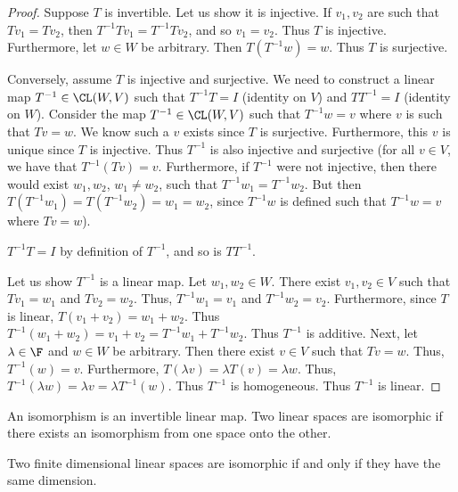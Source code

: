 \documentclass{article}
\begin{document}
  \begin{proof}
    Suppose $T$ is invertible. Let us show it is injective. If $v_1, v_2$ are such that $Tv_1 = Tv_2$, then $T^{-1}Tv_1 = T^{-1}Tv_2$, and so $v_1 = v_2$. Thus $T$ is injective. Furthermore,
    let $w \in W$ be arbitrary. Then $T(T^{-1}w) = w$. Thus $T$ is surjective. 

    Conversely, assume $T$ is injective and surjective. We need to construct a linear map $T^{-1} \in \CL(W, V)$ such that $T^{-1}T = I$ (identity on $V$) and $TT^{-1} = I$ (identity on
    $W$). Consider the map $T^{-1} \in \CL(W, V)$ such that $T^{-1}w = v$ where $v$ is such that $Tv = w$. We know such a $v$ exists since $T$ is surjective. Furthermore, this $v$ is unique
    since $T$ is injective. Thus $T^{-1}$ is also injective and surjective (for all $v \in V$, we have that $T^{-1}(Tv) = v$. Furthermore, if $T^{-1}$ were not injective, then there would
    exist $w_1, w_2$, $w_1 \neq w_2$, such that $T^{-1}w_1 = T^{-1}w_2$. But then $T(T^{-1}w_1) = T(T^{-1}w_2) = w_1 = w_2$, since $T^{-1}w$ is defined such that $T^{-1}w = v$ where $Tv =
    w$). 

    $T^{-1}T = I$ by definition of $T^{-1}$, and so is $TT^{-1}$.

    Let us show $T^{-1}$ is a linear map. Let $w_1, w_2 \in W$. There exist $v_1, v_2 \in V$ such that $Tv_1 = w_1$ and $Tv_2 = w_2$. Thus, $T^{-1}w_1 = v_1$ and $T^{-1}w_2 = v_2$.
    Furthermore, since $T$ is linear, $T(v_1 + v_2) = w_1 + w_2$. Thus $T^{-1}(w_1 + w_2) = v_1 + v_2 = T^{-1}w_1 + T^{-1}w_2$. Thus $T^{-1}$ is additive. Next, let $\lambda \in \F$ and $w
    \in W$ be arbitrary. Then there exist $v \in V$ such that $Tv = w$.  Thus, $T^{-1}(w) = v$. Furthermore, $T(\lambda v) = \lambda T(v) = \lambda w$. Thus, $T^{-1}(\lambda w) = \lambda v =
    \lambda T^{-1}(w)$. Thus $T^{-1}$ is homogeneous. Thus $T^{-1}$ is linear.
  \end{proof}
  \begin{defn}
    An isomorphism is an invertible linear map. Two linear spaces are isomorphic if there exists an isomorphism from one space onto the other.
  \end{defn}
  \begin{prop}
    Two finite dimensional linear spaces are isomorphic if and only if they have the same dimension.
  \end{prop}
\end{document}
